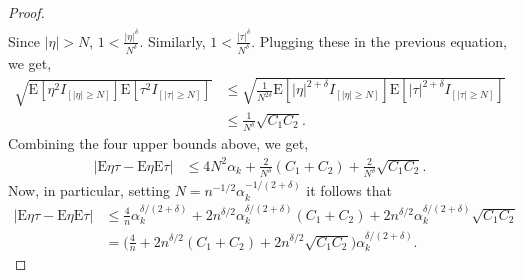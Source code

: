 \documentclass[11pt]{amsart}
\newcommand{\E}{\mathrm{E}}
\begin{document}
\begin{proof}
\begin{align}
     \end{align}
     Since $|\eta|>N$, $1<\frac{|\eta|^{\delta}}{N^{\delta}}$. Similarly, $1<\frac{|\tau|^{\delta}}{N^{\delta}}$. Plugging these in the previous equation, we get,
     \begin{align}
         \sqrt{\E\left[\eta^2 I_{[|\eta| \geq N]} \right]\E\left[\tau^2 I_{[|\tau|\geq N]} \right]}& \leq \sqrt{\frac{1}{N^{2\delta}}\E\left[|\eta|^{2+\delta} I_{[|\eta| \geq N]} \right]\E\left[|\tau|^{2+\delta} I_{[|\tau|\geq N]} \right] }\\
         & \leq \frac{1}{N^{\delta}} \sqrt{C_1C_2}.
     \end{align}
     Combining the four upper bounds above, we get,
     \begin{align}
     |\E\eta\tau-\E\eta \E\tau| & \leq 4N^2\alpha_k+\frac{2}{N^{\delta}}(C_1+C_2)+\frac{2}{N^{\delta}}\sqrt{C_1 C_2}.
     \end{align}
Now, in particular, setting $N=n^{-1/2}\alpha_k^{-1/(2+\delta)}$ it follows that
    \begin{align}
     |\E\eta\tau-\E\eta \E\tau| & \leq
     \frac{4}{n}\alpha_k^{\delta/(2+\delta)}+2n^{\delta/2}\alpha_k^{\delta/(2+\delta)}(C_1+C_2)+2n^{\delta/2}\alpha_k^{\delta/(2+\delta)}\sqrt{C_1C_2}\\ 
     & = \bigg(\frac{4}{n} +
     2n^{\delta/2}(C_1+C_2)+2n^{\delta/2}\sqrt{C_1C_2}\bigg)\alpha_k^{\delta/(2+\delta)}.
    \end{align}
\end{proof}
\end{document}
